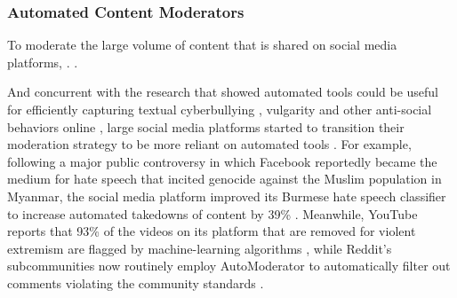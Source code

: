  
\subsubsection{Automated Content Moderators}
To moderate the large volume of content that is shared on social media platforms, . . 

And concurrent with the research that showed automated tools could be useful for efficiently capturing textual cyberbullying \cite{43_Dinakar, 44_Xu}, vulgarity and other anti-social behaviors online \cite{4_Chancellor, 1_Chandrasekharan, 5_Cheng}, large social media platforms started to transition their moderation strategy to be more reliant on automated tools \cite{35_Seering, 45_Geiger}. For example, following a major public controversy in which Facebook reportedly became the medium for hate speech that incited genocide against the Muslim population in Myanmar, the social media platform improved its Burmese hate speech classifier to increase automated takedowns of content by 39\% \cite{46_GIFCT}. Meanwhile, YouTube reports that 93\% of the videos on its platform that are removed for violent extremism are flagged by machine-learning algorithms \cite{40_Google}, while Reddit’s subcommunities now routinely employ AutoModerator to automatically filter out comments violating the community standards \cite{47_reddit}.

